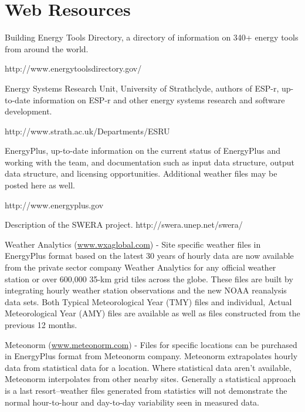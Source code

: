 \section{Web Resources}\label{web-resources}

Building Energy Tools Directory, a directory of information on 340+ energy tools from around the world.

http://www.energytoolsdirectory.gov/

Energy Systems Research Unit, University of Strathclyde, authors of ESP-r, up-to-date information on ESP-r and other energy systems research and software development.

http://www.strath.ac.uk/Departments/ESRU

EnergyPlus, up-to-date information on the current status of EnergyPlus and working with the team, and documentation such as input data structure, output data structure, and licensing opportunities. Additional weather files may be posted here as well.

http://www.energyplus.gov

Description of the SWERA project. http://swera.unep.net/swera/

Weather Analytics (\href{http://www.wxaglobal.com}{www.wxaglobal.com}) - Site specific weather files in EnergyPlus format based on the latest 30 years of hourly data are now available from the private sector company Weather Analytics for any official weather station or over 600,000 35-km grid tiles across the globe. These files are built by integrating hourly weather station observations and the new NOAA reanalysis data sets. Both Typical Meteorological Year (TMY) files and individual, Actual Meteorological Year (AMY) files are available as well as files constructed from the previous 12 months.

Meteonorm (\href{http://www.meteonorm.com}{www.meteonorm.com}) - Files for specific locations can be purchased in EnergyPlus format from Meteonorm company. Meteonorm extrapolates hourly data from statistical data for a location. Where statistical data aren't available, Meteonorm interpolates from other nearby sites. Generally a statistical approach is a last resort--weather files generated from statistics will not demonstrate the normal hour-to-hour and day-to-day variability seen in measured data.
